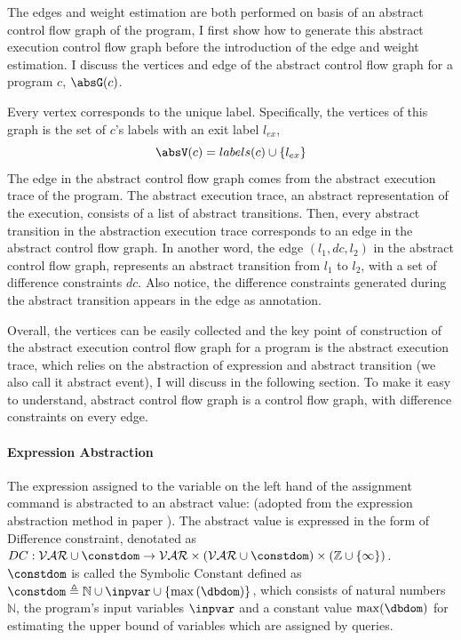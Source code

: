 The edges and weight estimation are both performed on basis of an abstract control flow graph of the program, I first show how to generate this abstract execution control flow graph before the introduction of  the edge and weight estimation.  
\label{sec:abscfg}
 I discuss the vertices and edge of the
abstract control flow graph for a program $c$, $\absG(c)$.

Every 
vertex corresponds to the unique
label.
Specifically,
the vertices of this graph is the set of $c$'s labels with an exit label $l_{ex}$, 
\[ 
  \absV(c) = labels(c)\cup\{l_{ex}\}
  \]
The edge in the abstract control flow graph comes from the abstract execution trace of the program. 
  The abstract execution trace, an abstract representation of the execution, consists of a list of abstract transitions. 
  Then, every abstract transition in the abstraction execution trace corresponds to an edge in the abstract control flow graph. In another word, the edge $(l_1, dc, l_2)$ in the abstract control flow graph, represents an abstract transition 
 from $l_1$ to $l_2$, with a set of difference constraints $dc$. 
 Also notice, the difference constraints generated during the abstract transition appears in the edge as annotation.

 Overall, the vertices can be easily collected and the key point of construction of the abstract execution control flow graph for a program is the abstract execution trace, 
  which relies on the abstraction of expression and abstract transition (we also call it abstract event), I will discuss in the following section.
   To make it easy to understand, abstract control flow graph is a control flow graph, with difference constraints on every edge.

   
%
\paragraph*{Expression Abstraction}

The expression assigned to the variable on the left hand of the assignment command is abstracted to an abstract value: (adopted from the expression abstraction method in paper \cite{SinnZV17}). The abstract value is expressed in the form of Difference constraint, denotated as $DC : \mathcal{VAR} \cup \constdom \to \mathcal{\mathcal{VAR} \times (\mathcal{VAR} \cup \constdom) } \times (\mathbb{Z} \cup \{\infty\})$.  $\constdom$ is called the Symbolic Constant defined as $\constdom \triangleq \mathbb{N} \cup \inpvar \cup \{\max{(\dbdom)}\} $, which consists of 
natural numbers $\mathbb{N}$,
the program's input variables $\inpvar$  
and a constant value $\max(\dbdom)$ for estimating the upper bound of variables which are
assigned by queries. 

